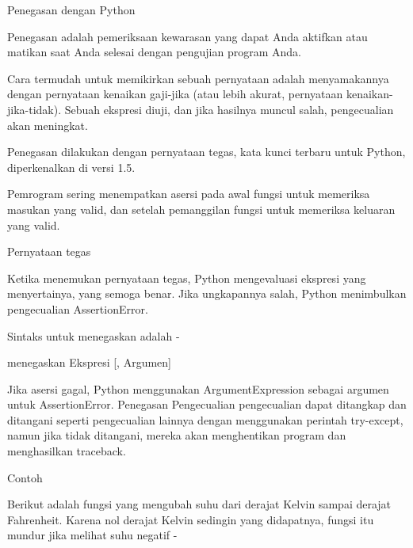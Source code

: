 \documentclass[a4paper,12pt]{report}
\begin{document}
\noindent 
\vspace{12pt}
\noindent 
Penegasan dengan Python \par
\vspace{12pt}
\noindent 
Penegasan adalah pemeriksaan kewarasan yang dapat Anda aktifkan atau matikan saat Anda selesai dengan pengujian program Anda. \par
\vspace{12pt}
\noindent 
Cara termudah untuk memikirkan sebuah pernyataan adalah menyamakannya dengan pernyataan kenaikan gaji-jika (atau lebih akurat, pernyataan kenaikan-jika-tidak). Sebuah ekspresi diuji, dan jika hasilnya muncul salah, pengecualian akan meningkat. \par
\vspace{12pt}
\noindent 
Penegasan dilakukan dengan pernyataan tegas, kata kunci terbaru untuk Python, diperkenalkan di versi 1.5. \par
\vspace{12pt}
\noindent 
Pemrogram sering menempatkan asersi pada awal fungsi untuk memeriksa masukan yang valid, dan setelah pemanggilan fungsi untuk memeriksa keluaran yang valid. \par
\noindent 
Pernyataan tegas \par
\vspace{12pt}
\noindent 
Ketika menemukan pernyataan tegas, Python mengevaluasi ekspresi yang menyertainya, yang semoga benar. Jika ungkapannya salah, Python menimbulkan pengecualian AssertionError. \par
\vspace{12pt}
\noindent 
Sintaks untuk menegaskan adalah - \par
\vspace{12pt}
\noindent 
menegaskan Ekspresi [, Argumen] \par
\vspace{12pt}
\noindent 
Jika asersi gagal, Python menggunakan ArgumentExpression sebagai argumen untuk AssertionError. Penegasan Pengecualian pengecualian dapat ditangkap dan ditangani seperti pengecualian lainnya dengan menggunakan perintah try-except, namun jika tidak ditangani, mereka akan menghentikan program dan menghasilkan traceback. \par
\noindent 
Contoh \par
\vspace{12pt}
\noindent 
Berikut adalah fungsi yang mengubah suhu dari derajat Kelvin sampai derajat Fahrenheit. Karena nol derajat Kelvin sedingin yang didapatnya, fungsi itu mundur jika melihat suhu negatif - \par
\end{document}
